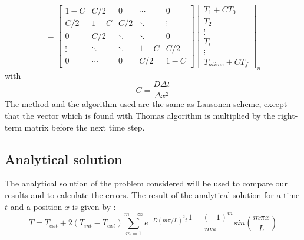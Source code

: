 \documentclass{article}
\begin{document}
                        \[
                            =
                            \begin{bmatrix}
                                1-C    &C/2    & 0      & \cdots & 0 \\
                                C/2     & 1-C   & C/2     & \ddots & \vdots \\
                                0      & C/2     & \ddots & \ddots & 0 \\
                                \vdots & \ddots & \ddots & 1-C   & C/2\\
                                0      & \cdots & 0      & C/2     & 1-C
                            \end{bmatrix}
                            \begin{bmatrix}
                                T_{1} + CT_{0}\\
                                T_{2} \\
                                \vdots \\
                                T_{i} \\
                                \vdots \\
                                T_{ntime} + CT_{f}
                            \end{bmatrix}_{n}
                        \]
                        with $$C = \frac{D\Delta t}{\Delta x ^2}  $$ 
                        The method and the algorithm used are the same as Laasonen scheme, except that the vector which is found with Thomas algorithm
                        is multiplied by the right-term matrix before the next time step.
    
                \subsection{Analytical solution}
                    The analytical solution of the problem considered will be used to compare our results and to calculate
                the errors. The result of the analytical solution for a time $t$ and a position $x$ is given by : 
                \begin{equation}
                    \label{eq:analytical}
                    T = T_{ext}+2(T_{int}-T_{ext})\sum_{m=1}^{m=\infty} e^{-D(m\pi / L)^{2}t} \frac{1-(-1)^m}{m\pi} sin(\frac{m\pi x}{L})
                \end{equation}
    
    
        \newpage
\end{document}
